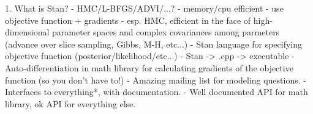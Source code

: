 


1. What is Stan?
 - HMC/L-BFGS/ADVI/...? 
   - memory/cpu efficient
	 - use objective function + gradients
	 - esp. HMC, efficient in the face of high-dimensional parameter spaces and 
	   complex covariances among parmeters (advance over slice sampling, 
		 Gibbs, M-H, etc...)
 - Stan language for specifying objective function (posterior/likelihood/etc...)
   - Stan -> .cpp -> executable
 - Auto-differentiation in math library for calculating gradients of the 
     objective function (so you don't have to!)
 - Amazing mailing list for modeling questions.
 - Interfaces to everything*, with documentation.
 - Well documented API for math library, ok API for everything else.




